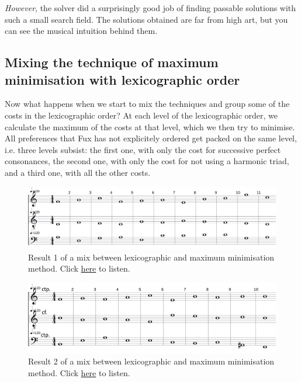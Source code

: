 \textit{However}, the solver did a surprisingly good job of finding passable solutions with such a small search field. The solutions obtained are far from high art, but you can see the musical intuition behind them.

\subsection{Mixing the technique of maximum minimisation with lexicographic order}\label{subsection:mixing-the-techniques}
Now what happens when we start to mix the techniques and group some of the costs in the lexicographic order? At each level of the lexicographic order, we calculate the maximum of the costs at that level, which we then try to minimise. All preferences that Fux has not explicitely ordered get packed on the same level, i.e. three levels subsist: the first one, with only the cost for successive perfect consonances, the second one, with only the cost for not using a harmonic triad, and a third one, with all the other costs.

\begin{figure}[h]
    \centering
    \includegraphics[width=1\textwidth]{Images/Experiments/min-1sp.png}
    \caption{Result 1 of a mix between lexicographic and maximum minimisation method. Click \href{https://example.com/}{here} to listen.}
    \label{fig:min-sp}
\end{figure} 
\begin{figure}[h]
    \centering
    \includegraphics[width=1\textwidth]{Images/Experiments/min-1sp0.png}
    \caption{Result 2 of a mix between lexicographic and maximum minimisation method. Click \href{https://youtu.be/GRGE7NN3jNE}{here} to listen.}
    \label{fig:min-sp0}
\end{figure}

